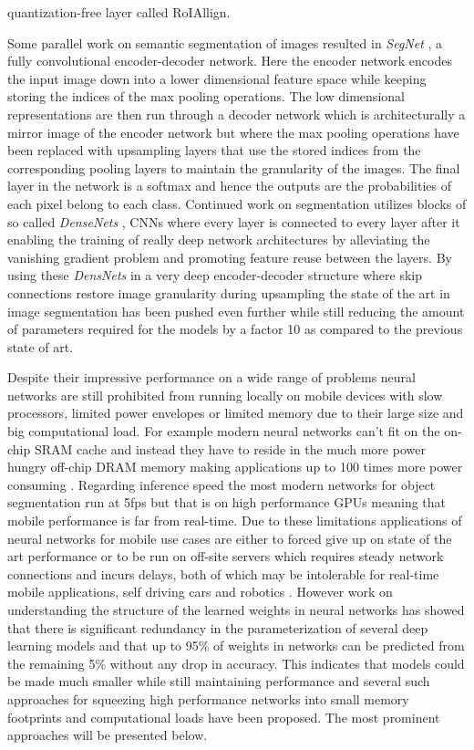 \documentclass{kththesis}
\newcommand{\bibentry}[1]{\parencite{#1}}
\begin{document}
quantization-free layer called RoIAllign.

Some parallel work on semantic segmentation of images resulted in \emph{SegNet} \bibentry{badrinarayanan2015segnet}, a fully convolutional encoder-decoder network. Here the encoder network encodes the input image down into a lower dimensional feature space while keeping storing the indices of the max pooling operations. The low dimensional representations are then run through a decoder network which is architecturally a mirror image of the encoder network but where the max pooling operations have been replaced with upsampling layers that use the stored indices from the corresponding pooling layers to maintain the granularity of the images. The final layer in the network is a softmax and hence the outputs are the probabilities of each pixel belong to each class.
Continued work on segmentation utilizes blocks of so called \emph{DenseNets} \bibentry{huang2017densely}, CNNs where every layer is connected to every layer after it enabling the training of really deep network architectures by alleviating the vanishing gradient problem and promoting feature reuse between the layers. By using these \emph{DensNets} in a very deep encoder-decoder structure where skip connections restore image granularity during upsampling the state of the art in image segmentation has been pushed even further \bibentry{jegou2017one} while still reducing the amount of parameters required for the models by a factor 10 as compared to the previous state of art.

Despite their impressive performance on a wide range of problems neural networks are still prohibited from running locally on mobile devices with slow processors, limited power envelopes or limited memory due to their large size and big computational load. For example modern neural networks can't fit on the on-chip SRAM cache and instead they have to reside in the much more power hungry off-chip DRAM memory making applications up to 100 times more power consuming \bibentry{han2015learning}. Regarding inference speed the most modern networks for object segmentation \bibentry{he2017mask} run at 5fps but that is on high performance GPUs meaning that mobile performance is far from real-time. Due to these limitations applications of neural networks for mobile use cases are either to forced give up on state of the art performance or to be run on off-site servers which requires steady network connections and incurs delays, both of which may be intolerable for real-time mobile applications, self driving cars and robotics \bibentry{jin2014flattened}. However work on understanding the structure of the learned weights in neural networks \bibentry{denil2013predicting} has showed that there is significant redundancy in the parameterization of several deep learning models and that up to 95\% of weights in networks can be predicted from the remaining 5\% without any drop in accuracy. This indicates that models could be made much smaller while still maintaining performance and several such approaches for squeezing high performance networks into small memory footprints and computational loads have been proposed. The most prominent approaches will be presented below. 
\end{document}
